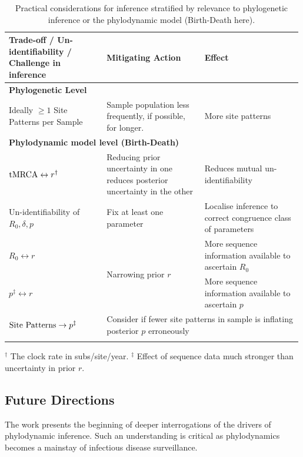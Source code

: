 \documentclass{article}
\begin{document}
\begin{table}[H]
\centering
\caption{Practical considerations for inference stratified by relevance to phylogenetic inference or the phylodynamic model (Birth-Death here).}
\begin{tabular}{p{0.33\linewidth} | p{0.33\linewidth} | p{0.33\linewidth}} 
\midrule
Trade-off / Un-identifiability / Challenge in inference & 
Mitigating Action &
Effect\\
\midrule
\multicolumn{3}{l}{\textbf{Phylogenetic Level}}\\

\midrule
Ideally $\geq1$ Site Patterns per Sample &
Sample population less frequently, if possible, for longer. &
More site patterns\\[0.25cm]

\midrule
\multicolumn{3}{l}{\textbf{Phylodynamic model level (Birth-Death)}}\\   

\midrule
$\textnormal{tMRCA} \leftrightarrow r^\dagger$  & 
Reducing prior uncertainty in one reduces posterior uncertainty in the other &
Reduces mutual un-identifiability \\[0.25cm]

Un-identifiability of $R_{0}, \delta, p$ &
Fix at least one parameter \citep{louca2021fundamental} &
Localise inference to correct congruence class of parameters\\[0.25cm]

$R_0 \leftrightarrow r$ &
\multirow{2}{*}{Narrowing prior $r$} &
More sequence information available to ascertain $R_0$\\[0.25cm]

$p^{\ddagger} \leftrightarrow r$ &
&
More sequence information available to ascertain $p$\\[0.25cm]

$\textnormal{Site Patterns} \rightarrow p^{\ddagger}$ &
\multicolumn{2}{l}{Consider if fewer site patterns in sample is inflating posterior $p$ erroneously}\\

\bottomrule 
\label{tab:pracRec}
\end{tabular}
\end{table}
\footnotesize{$^\dagger$ The clock rate in subs/site/year. $^{\ddagger}$ Effect of sequence data much stronger than uncertainty in prior $r$.}

\subsection*{Future Directions}
The work presents the beginning of deeper interrogations of the drivers of phylodynamic inference. Such an understanding is critical as phylodynamics becomes a mainstay of infectious disease surveillance.
\end{document}
